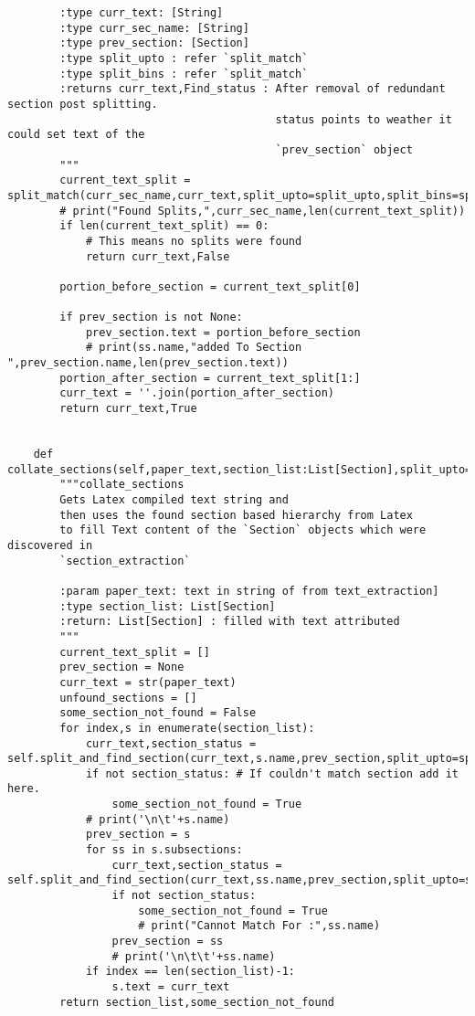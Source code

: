 \begin{lstlisting}
        :type curr_text: [String]
        :type curr_sec_name: [String]
        :type prev_section: [Section]
        :type split_upto : refer `split_match`
        :type split_bins : refer `split_match`
        :returns curr_text,Find_status : After removal of redundant section post splitting. 
                                         status points to weather it could set text of the 
                                         `prev_section` object
        """
        current_text_split = split_match(curr_sec_name,curr_text,split_upto=split_upto,split_bins=split_bins)
        # print("Found Splits,",curr_sec_name,len(current_text_split))
        if len(current_text_split) == 0: 
            # This means no splits were found 
            return curr_text,False

        portion_before_section = current_text_split[0] 

        if prev_section is not None:
            prev_section.text = portion_before_section
            # print(ss.name,"added To Section ",prev_section.name,len(prev_section.text))
        portion_after_section = current_text_split[1:]
        curr_text = ''.join(portion_after_section)
        return curr_text,True

    
    def collate_sections(self,paper_text,section_list:List[Section],split_upto=0.2,split_bins=10):
        """collate_sections 
        Gets Latex compiled text string and 
        then uses the found section based hierarchy from Latex
        to fill Text content of the `Section` objects which were discovered in 
        `section_extraction`

        :param paper_text: text in string of from text_extraction]
        :type section_list: List[Section]
        :return: List[Section] : filled with text attributed
        """
        current_text_split = []
        prev_section = None
        curr_text = str(paper_text)
        unfound_sections = []
        some_section_not_found = False
        for index,s in enumerate(section_list):
            curr_text,section_status = self.split_and_find_section(curr_text,s.name,prev_section,split_upto=split_upto,split_bins=split_bins)
            if not section_status: # If couldn't match section add it here. 
                some_section_not_found = True
            # print('\n\t'+s.name)                
            prev_section = s 
            for ss in s.subsections:
                curr_text,section_status = self.split_and_find_section(curr_text,ss.name,prev_section,split_upto=split_upto,split_bins=split_bins)
                if not section_status:
                    some_section_not_found = True
                    # print("Cannot Match For :",ss.name)
                prev_section = ss
                # print('\n\t\t'+ss.name)
            if index == len(section_list)-1:
                s.text = curr_text
        return section_list,some_section_not_found
    

\end{lstlisting}
